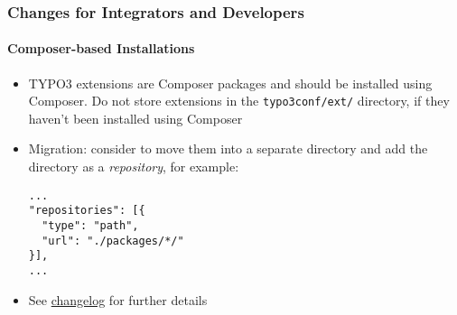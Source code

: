 %

\begin{frame}[fragile]
	\frametitle{Changes for Integrators and Developers}
	\framesubtitle{Composer-based Installations}


	\begin{itemize}
		\item TYPO3 extensions are Composer packages and should be installed using
			Composer. Do not store extensions in the \texttt{typo3conf/ext/}
			directory, if they haven't been installed using Composer
		\item Migration: consider to move them into a separate directory and add
			the directory as a \textit{repository}, for example:

\begin{lstlisting}
...
"repositories": [{
  "type": "path",
  "url": "./packages/*/"
}],
...
\end{lstlisting}

		\item See
			\href{https://docs.typo3.org/c/typo3/cms-core/master/en-us/Changelog/master/Deprecation-94996-InComposerModeAllExtensionsShouldBeInstalledWithComposer.html}{changelog}
			for further details
	\end{itemize}
\end{frame}

